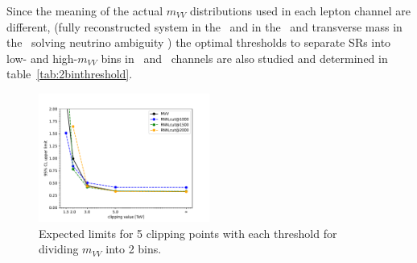 Since the meaning of the actual $m_{VV}$ distributions used in each lepton channel are different,
(fully reconstructed system in the \tlep\ and in the \olep\, and transverse mass in the \zlep\ solving neutrino ambiguity )
the optimal thresholds to separate SRs into low- and high-$m_{VV}$ bins in \olep\ and \zlep\ channels are also studied and  determined in table~\ref{tab:2binthreshold}.
\begin{figure}[h]
        \centering
    	\includegraphics[width=0.50\textwidth]{figures/aQGC/ClippedFT02bin.pdf}
        \caption{Expected limits for 5 clipping points with each threshold for dividing $m_{VV}$ into 2 bins.}
        \label{fig:ThresholdScan}
\end{figure}

